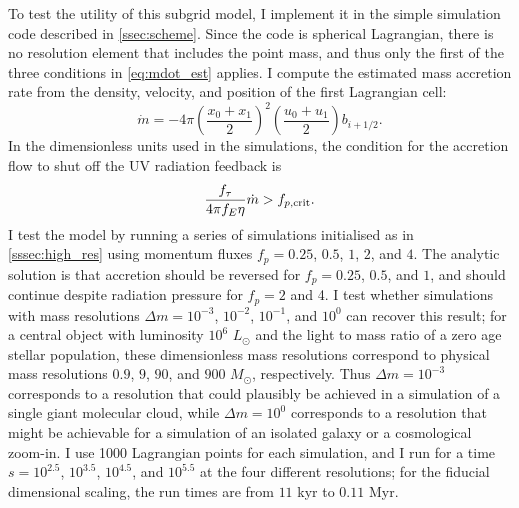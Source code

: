 \documentclass[useAMS,usenatbib]{mn2e}
\begin{document}
To test the utility of this subgrid model, I implement it in the simple simulation code described in \autoref{ssec:scheme}. Since the code is spherical Lagrangian, there is no resolution element that includes the point mass, and thus only the first of the three conditions in \autoref{eq:mdot_est} applies. I compute the estimated mass accretion rate from the density, velocity, and position of the first Lagrangian cell:
\begin{equation}
\dot{m} = -4\pi \left(\frac{x_0+x_1}{2}\right)^2 \left(\frac{u_0+u_1}{2}\right) b_{i+1/2}.
\end{equation}
In the dimensionless units used in the simulations, the condition for the accretion flow to shut off the UV radiation feedback is
\begin{equation}
\frac{f_\tau}{4\pi f_E\eta} \dot{m} > f_{p,\rm crit}.
\end{equation}
I test the model by running a series of simulations initialised as in \autoref{sssec:high_res} using momentum fluxes $f_p = 0.25$, $0.5$, $1$, $2$, and $4$. The analytic solution is that accretion should be reversed for $f_p = 0.25$, $0.5$, and $1$, and should continue despite radiation pressure for $f_p = 2$ and 4. I test whether simulations with mass resolutions $\Delta m = 10^{-3}$, $10^{-2}$, $10^{-1}$, and $10^{0}$ can recover this result; for a central object with luminosity $10^6$ $L_\odot$ and the light to mass ratio of a zero age stellar population, these dimensionless mass resolutions correspond to physical mass resolutions $0.9$, $9$, $90$, and $900$ $M_\odot$, respectively. Thus $\Delta m = 10^{-3}$ corresponds to a resolution that could plausibly be achieved in a simulation of a single giant molecular cloud, while $\Delta m = 10^{0}$ corresponds to a resolution that might be achievable for a simulation of an isolated galaxy or a cosmological zoom-in. I use 1000 Lagrangian points for each simulation, and I run for a time $s=10^{2.5}$, $10^{3.5}$, $10^{4.5}$, and $10^{5.5}$ at the four different resolutions; for the fiducial dimensional scaling, the run times are from $11$ kyr to $0.11$ Myr.
\end{document}
